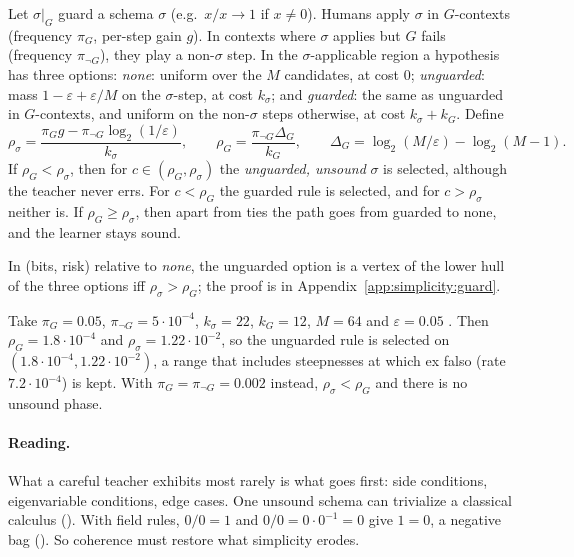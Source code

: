 \begin{proposition}\label{prop:simplicity:guard}
Let $\sigma|_G$ guard a schema $\sigma$ (e.g.\ $x/x\to1$ if $x\neq0$). Humans apply $\sigma$ in $G$-contexts (frequency $\pi_G$, per-step gain $g$). In contexts where $\sigma$ applies but $G$ fails (frequency $\pi_{\neg G}$), they play a non-$\sigma$ step. In the $\sigma$-applicable region a hypothesis has three options: \emph{none}: uniform over the $M$ candidates, at cost $0$; \emph{unguarded}: mass $1-\varepsilon+\varepsilon/M$ on the $\sigma$-step, at cost $k_\sigma$; and \emph{guarded}: the same as unguarded in $G$-contexts, and uniform on the non-$\sigma$ steps otherwise, at cost $k_\sigma+k_G$.
Define
\[
\rho_\sigma=\frac{\pi_Gg-\pi_{\neg G}\log_2(1/\varepsilon)}{k_\sigma},\qquad\rho_G=\frac{\pi_{\neg G}\Delta_G}{k_G},\qquad\Delta_G=\log_2(M/\varepsilon)-\log_2(M-1).
\]
If $\rho_G<\rho_\sigma$, then for $c\in(\rho_G,\rho_\sigma)$ the \emph{unguarded, unsound} $\sigma$ is selected, although the teacher never errs. For $c<\rho_G$ the guarded rule is selected, and for $c>\rho_\sigma$ neither is. If $\rho_G\ge\rho_\sigma$, then apart from ties the path goes from guarded to none, and the learner stays sound.
\end{proposition}

In (bits, risk) relative to \emph{none}, the unguarded option is a vertex of the lower hull of the three options iff $\rho_\sigma>\rho_G$; the proof is in Appendix~\ref{app:simplicity:guard}.

Take $\pi_G=0.05$, $\pi_{\neg G}=5\cdot10^{-4}$, $k_\sigma=22$, $k_G=12$, $M=64$ and $\varepsilon=0.05$ . Then $\rho_G=1.8\cdot10^{-4}$ and $\rho_\sigma=1.22\cdot10^{-2}$, so the unguarded rule is selected on $(1.8\cdot10^{-4},1.22\cdot10^{-2})$, a range that includes steepnesses at which ex falso (rate $7.2\cdot10^{-4}$) is kept. With $\pi_G=\pi_{\neg G}=0.002$ instead, $\rho_\sigma<\rho_G$ and there is no unsound phase.

\paragraph{Reading.} What a careful teacher exhibits most rarely is what goes first: side conditions, eigenvariable conditions, edge cases. One unsound schema can trivialize a classical calculus (). With field rules, $0/0=1$ and $0/0=0\cdot0^{-1}=0$ give $1=0$, a negative bag (). So coherence must restore what simplicity erodes.

